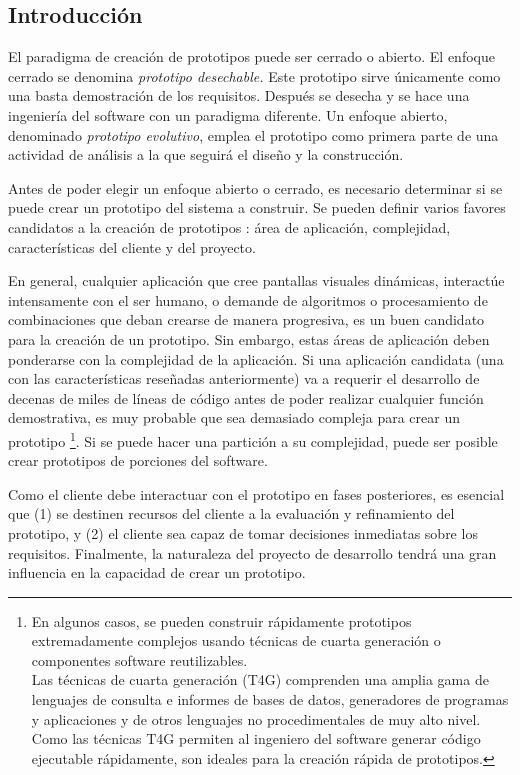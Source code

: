 	\subsection{Introducción} %
		\label{sub:analisis_prototipo_introduccion}
		
		El paradigma de creación de prototipos puede ser cerrado o abierto. El enfoque cerrado se denomina {\it prototipo desechable.} Este prototipo sirve únicamente como una basta demostración de los requisitos. Después se desecha y se hace una ingeniería del software con un paradigma diferente. Un enfoque abierto, denominado {\it prototipo evolutivo}, emplea el prototipo como primera parte de una actividad de análisis a la que seguirá el diseño y la construcción. 
		
		Antes de poder elegir un enfoque abierto o cerrado, es necesario determinar si se puede crear un prototipo del sistema a construir. Se pueden definir varios favores candidatos a la creación de prototipos \cite{BOA84}: área de aplicación, complejidad, características del cliente y del proyecto.
		
		En general, cualquier aplicación que cree pantallas visuales dinámicas, interactúe intensamente con el ser humano, o demande de algoritmos o procesamiento de combinaciones que deban crearse de manera progresiva, es un buen candidato para la creación de un prototipo. Sin embargo, estas áreas de aplicación deben ponderarse con la complejidad de la aplicación. Si una aplicación candidata (una con las características reseñadas anteriormente) va a requerir el desarrollo de decenas de miles de líneas de código antes de poder realizar cualquier función demostrativa, es muy probable que sea demasiado compleja para crear un prototipo \footnote{En algunos casos, se pueden construir rápidamente prototipos extremadamente complejos usando técnicas de cuarta generación o componentes software reutilizables. \\Las técnicas de cuarta generación (T4G) comprenden una amplia gama de lenguajes de consulta e informes de bases de datos, generadores de programas y aplicaciones y de otros lenguajes no procedimentales de muy alto nivel. Como las técnicas T4G permiten al ingeniero del software generar código ejecutable rápidamente, son ideales para la creación rápida de prototipos.}. Si se puede hacer una partición a su complejidad, puede ser posible crear prototipos de porciones del software.
		
		Como el cliente debe interactuar con el prototipo en fases posteriores, es esencial que (1) se destinen recursos del cliente a la evaluación y refinamiento del prototipo, y (2) el cliente sea capaz de tomar decisiones inmediatas sobre los requisitos. Finalmente, la naturaleza del proyecto de desarrollo tendrá una gran influencia en la capacidad de crear un prototipo.
		
